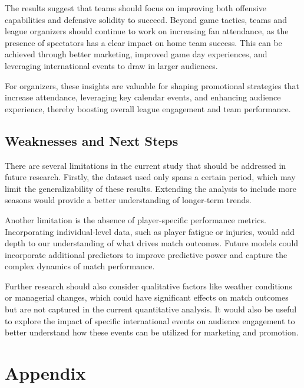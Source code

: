 \documentclass[
  letterpaper,
  DIV=11,
  numbers=noendperiod]{scrartcl}
\begin{document}
The results suggest that teams should focus on improving both offensive
capabilities and defensive solidity to succeed. Beyond game tactics,
teams and league organizers should continue to work on increasing fan
attendance, as the presence of spectators has a clear impact on home
team success. This can be achieved through better marketing, improved
game day experiences, and leveraging international events to draw in
larger audiences.

For organizers, these insights are valuable for shaping promotional
strategies that increase attendance, leveraging key calendar events, and
enhancing audience experience, thereby boosting overall league
engagement and team performance.

\hypertarget{sec-weaknesses}{%
\subsection{Weaknesses and Next Steps}\label{sec-weaknesses}}

There are several limitations in the current study that should be
addressed in future research. Firstly, the dataset used only spans a
certain period, which may limit the generalizability of these results.
Extending the analysis to include more seasons would provide a better
understanding of longer-term trends.

Another limitation is the absence of player-specific performance
metrics. Incorporating individual-level data, such as player fatigue or
injuries, would add depth to our understanding of what drives match
outcomes. Future models could incorporate additional predictors to
improve predictive power and capture the complex dynamics of match
performance.

Further research should also consider qualitative factors like weather
conditions or managerial changes, which could have significant effects
on match outcomes but are not captured in the current quantitative
analysis. It would also be useful to explore the impact of specific
international events on audience engagement to better understand how
these events can be utilized for marketing and promotion.

\newpage

\appendix

\hypertarget{appendix}{%
\section*{Appendix}\label{appendix}}
\end{document}
